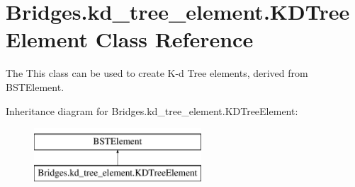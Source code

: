 \hypertarget{class_bridges_1_1kd__tree__element_1_1_k_d_tree_element}{}\section{Bridges.\+kd\+\_\+tree\+\_\+element.\+K\+D\+Tree\+Element Class Reference}
\label{class_bridges_1_1kd__tree__element_1_1_k_d_tree_element}


The This class can be used to create K-\/d Tree elements, derived from B\+S\+T\+Element.  


Inheritance diagram for Bridges.\+kd\+\_\+tree\+\_\+element.\+K\+D\+Tree\+Element\+:\begin{figure}[H]
\begin{center}
\leavevmode
\includegraphics[height=2.000000cm]{class_bridges_1_1kd__tree__element_1_1_k_d_tree_element}
\end{center}
\end{figure}

